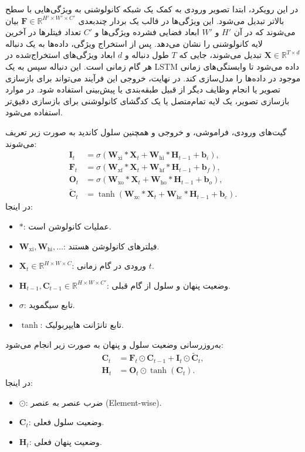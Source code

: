 در این رویکرد، ابتدا تصویر ورودی به کمک یک شبکه کانولوشنی به ویژگی‌هایی با سطح بالاتر تبدیل می‌شود. این ویژگی‌ها در قالب یک بردار چندبعدی $\mathbf{F} \in \mathbb{R}^{H' \times W' \times C'}$ بیان می‌شوند که در آن $H'$ و $W'$ ابعاد فضایی فشرده ویژگی‌ها و $C'$ تعداد فیتلر‌ها در آخرین لایه کانولوشنی را نشان می‌دهد. پس از استخراج ویژگی، داده‌ها به یک دنباله $\mathbf{X} \in \mathbb{R}^{T \times d}$ تبدیل می‌شوند، جایی که $T$ طول دنباله و $d$ ابعاد ویژگی‌های استخراج‌شده در هر گام زمانی است. این دنباله سپس به یک LSTM داده می‌شود تا وابستگی‌های زمانی موجود در داده‌ها را مدل‌سازی کند. در نهایت، خروجی این فرآیند می‌تواند برای بازسازی تصویر یا انجام وظایف دیگر از قبیل طبقه‌بندی یا پیش‌بینی استفاده شود. در موارد بازسازی تصویر، یک لایه تمام‌متصل یا یک کدگشای کانولوشنی برای بازسازی دقیق‌تر استفاده می‌شود.

گیت‌های ورودی، فراموشی، و خروجی و همچنین سلول کاندید به صورت زیر تعریف می‌شوند:
\[
\begin{aligned}
	\mathbf{I}_t &= \sigma \left( \mathbf{W}_{\text{xi}} * \mathbf{X}_t + \mathbf{W}_{\text{hi}} * \mathbf{H}_{t-1} + \mathbf{b}_i \right), \\
	\mathbf{F}_t &= \sigma \left( \mathbf{W}_{\text{xf}} * \mathbf{X}_t + \mathbf{W}_{\text{hf}} * \mathbf{H}_{t-1} + \mathbf{b}_f \right), \\
	\mathbf{O}_t &= \sigma \left( \mathbf{W}_{\text{xo}} * \mathbf{X}_t + \mathbf{W}_{\text{ho}} * \mathbf{H}_{t-1} + \mathbf{b}_o \right), \\
	\tilde{\mathbf{C}}_t &= \tanh \left( \mathbf{W}_{\text{xc}} * \mathbf{X}_t + \mathbf{W}_{\text{hc}} * \mathbf{H}_{t-1} + \mathbf{b}_c \right).
\end{aligned}
\]
در اینجا:
\begin{itemize}
	\item \(*\): عملیات کانولوشن است.
	\item \(\mathbf{W}_{\text{xi}}, \mathbf{W}_{\text{hi}}, \dots\): فیلترهای کانولوشن هستند.
	\item \(\mathbf{X}_t \in \mathbb{R}^{H \times W \times C}\): ورودی در گام زمانی \(t\).
	\item \(\mathbf{H}_{t-1}, \mathbf{C}_{t-1} \in \mathbb{R}^{H \times W \times C'}\): وضعیت پنهان و سلول از گام قبلی.
	\item \(\sigma\): تابع سیگموید.
	\item \(\tanh\): تابع تانژانت هایپربولیک.
\end{itemize}

به‌روزرسانی وضعیت سلول و پنهان به صورت زیر انجام می‌شود:
\[
\begin{aligned}
	\mathbf{C}_t &= \mathbf{F}_t \odot \mathbf{C}_{t-1} + \mathbf{I}_t \odot \tilde{\mathbf{C}}_t, \\
	\mathbf{H}_t &= \mathbf{O}_t \odot \tanh(\mathbf{C}_t).
\end{aligned}
\]
در اینجا:
\begin{itemize}
	\item \(\odot\): ضرب عنصر به عنصر (Element-wise).
	\item \(\mathbf{C}_t\): وضعیت سلول فعلی.
	\item \(\mathbf{H}_t\): وضعیت پنهان فعلی.
\end{itemize}

